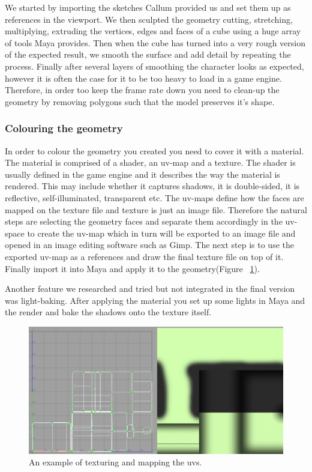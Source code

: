 \documentclass[a4paper,oneside]{memoir}
\begin{document}
                We started by importing the sketches Callum provided us and set them up as references in the viewport. We then sculpted the geometry cutting, stretching, multiplying, extruding the vertices, edges and faces of a cube using a huge array of tools Maya provides. Then when the cube has turned into a very rough version of the expected result, we smooth the surface and add  detail by repeating the process. Finally after several layers of smoothing the character looks as expected, however it is often the case for it to be too heavy to load in a game engine. Therefore, in order too keep the frame rate down you need to clean-up the geometry by removing polygons such that the model preserves it's shape.
                
            \subsubsection{Colouring the geometry}
            
                In order to colour the geometry you created you need to cover it with a material. The material is comprised of a shader, an uv-map and a texture. The shader is usually defined in the game engine and it describes the way the material is rendered. This may include whether it captures shadows, it is double-sided, it is reflective, self-illuminated, transparent etc. The uv-maps define how the faces are mapped on the texture file and texture is just an image file. Therefore the natural steps are selecting the geometry faces and separate them accordingly in the uv-space to create the uv-map which in turn will be exported to an image file and opened in an image editing software such as Gimp. The next step is to use the exported uv-map as a references and draw the final texture file on top of it. Finally import it into Maya and apply it to the geometry(Figure ~\ref{fig:An example of texturing and mapping the uvs.}).
                
                Another feature we researched and tried but not integrated in the final version was light-baking. After applying the material you set up some lights in Maya and the render and bake the shadows onto the texture itself.


			\begin{figure}[ht]
				\begin{center}
					\includegraphics[width=120mm]{"../Screenshots/Maya/textures"}
					\caption{An example of texturing and mapping the uvs.}
					\label{fig:An example of texturing and mapping the uvs.}
				\end{center}
			\end{figure}
                
\end{document}
